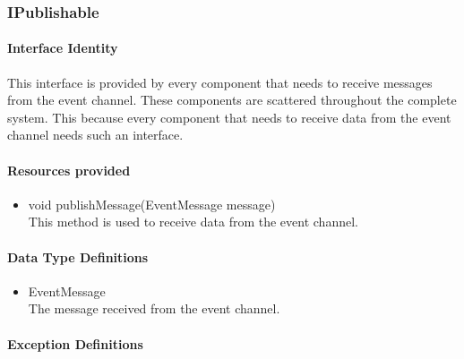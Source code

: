 \subsubsection{IPublishable}
\paragraph{Interface Identity}
This interface is provided by every component that needs to receive messages
	from the event channel. These components
	are scattered throughout the complete system. This because every component
	that needs to receive data from the event channel needs such an interface.
\paragraph{Resources provided}
\begin{itemize}
	\item{void publishMessage(EventMessage message)}\\
	This method is used to receive data from the event channel.
\end{itemize}
\paragraph{Data Type Definitions}
\begin{itemize}
	\item EventMessage\\
	The message received from the event channel.
\end{itemize}
\paragraph{Exception Definitions}
